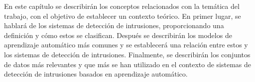En este capítulo se describirán los conceptos relacionados con la temática del trabajo, con el objetivo de establecer un contexto teórico. En primer lugar, se hablará de los sistemas de detección de intrusiones, proporcionando una definición y cómo estos se clasifican. Después se describirán los modelos de aprendizaje automático más comunes y se establecerá una relación entre estos y los sistemas de detección de intrusiones. Finalmente, se describirán los conjuntos de datos más relevantes y que más se han utilizado en el contexto de sistemas de detección de intrusiones basados en aprendizaje automático. 